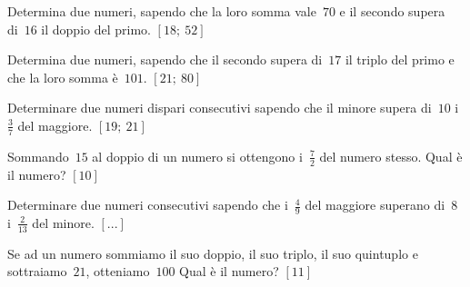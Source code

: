 
\subsubsection*{}

\begin{multicols}{2}

\begin{esercizio}[\Ast]
\label{ese:14.1}
Determina due numeri, sapendo che la loro somma vale~\(70\) e il secondo supera 
di~\(16\) il doppio del primo. \hfill \(\left[18;~52\right]\)
\end{esercizio}

\begin{esercizio}[\Ast]
\label{ese:14.2}
Determina due numeri, sapendo che il secondo supera di~\(17\) il triplo del primo 
e che la loro somma è~\(101\). \hfill \(\left[21;~80\right]\)
\end{esercizio}

\begin{esercizio}[\Ast]
\label{ese:14.3}
Determinare due numeri dispari consecutivi sapendo che il minore supera di~\(10\) 
i~\(\frac{3}{7}\) del maggiore. \hfill \(\left[19;~21\right]\)
\end{esercizio}

\begin{esercizio}[\Ast]
\label{ese:14.4}
Sommando~\(15\) al doppio di un numero si ottengono i~\(\frac{7}{2}\) del numero 
stesso. Qual è il numero? \hfill \(\left[10\right]\)
\end{esercizio}

\begin{esercizio}
\label{ese:14.5}
Determinare due numeri consecutivi sapendo che i~\(\frac{4}{9}\) del maggiore 
superano di~\(8\) i~\(\frac{2}{13}\) del minore. \hfill \(\left[...\right]\)
\end{esercizio}

\begin{esercizio}[\Ast]
\label{ese:14.6}
Se ad un numero sommiamo il suo doppio, il suo triplo, il suo quintuplo e 
sottraiamo~\(21\), otteniamo~\(100\) Qual è il numero? \hfill \(\left[11\right]\)
\end{esercizio}


\end{multicols}
